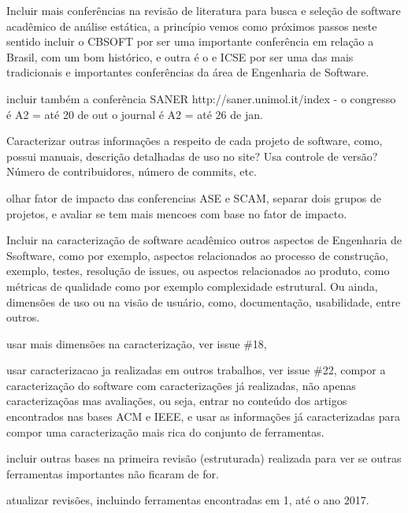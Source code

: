 Incluir mais conferências na revisão de literatura para busca e seleção de
software acadêmico de análise estática, a princípio vemos como próximos passos
neste sentido incluir o CBSOFT por ser uma importante conferência em relação a
Brasil, com um bom histórico, e outra é o e ICSE por ser uma das mais
tradicionais e importantes conferências da área de Engenharia de Software.

incluir também a conferência SANER http://saner.unimol.it/index -
 o congresso é A2 = até 20 de out
 o journal é A2 = até 26 de jan.

Caracterizar outras informações a respeito de cada projeto de software, como,
possui manuais, descrição detalhadas de uso no site? Usa controle de versão?
Número de contribuidores, número de commits, etc.

olhar fator de impacto das conferencias ASE e SCAM, separar dois grupos de
projetos, e avaliar se tem mais mencoes com base no fator de impacto.

Incluir na caracterização de software acadêmico outros aspectos de Engenharia
de Ssoftware, como por exemplo, aspectos relacionados ao processo de
construção, exemplo, testes, resolução de issues, ou aspectos relacionados ao
produto, como métricas de qualidade como por exemplo complexidade estrutural.
Ou ainda, dimensões de uso ou na visão de usuário, como, documentação,
usabilidade, entre outros.


usar mais dimensões na caracterização, ver issue \#18, 

usar caracterizacao ja realizadas em outros trabalhos, ver issue \#22,
compor a caracterização do software com caracterizações já realizadas,
não apenas caracterizaçõas mas avaliações, ou seja, entrar no conteúdo
dos artigos encontrados nas bases ACM e IEEE, e usar as informações
já caracterizadas para compor uma caracterização mais rica
do conjunto de ferramentas.

incluir outras bases na primeira revisão (estruturada) realizada para
ver se outras ferramentas importantes não ficaram de for.

atualizar revisões, incluindo ferramentas encontradas em 1, até o ano 2017. 

